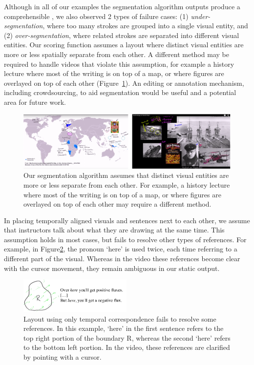 Although in all of our examples the segmentation algorithm outputs produce a comprehensible \systemname , we also observed 2 types of failure cases: (1) \textit{under-segmentation}, where too many strokes are grouped into a single visual entity, and (2) \textit{over-segmentation}, where related strokes are separated into different visual entities. Our scoring function assumes a layout where distinct visual entities are more or less spatially separate from each other. A different method may be required to handle videos that violate this assumption, for example a history lecture where most of the writing is on top of a map, or where figures are overlayed on top of each other (Figure~\ref{fig:humanities_lec}).  An editing or annotation mechanism, including crowdsourcing, to aid segmentation would be useful and a potential area for future work.\\
%
\begin{figure}[h!]
        \centering
        \includegraphics[width=\textwidth]{figures/humanities_lec.pdf}
                \captionsetup{font=footnotesize}
	\caption{Our segmentation algorithm assumes that distinct visual entities are more or less separate from each other. For example, a history lecture
where most of the writing is on top of a map, or where figures are overlayed
on top of each other may require a different method. }
        \label{fig:humanities_lec}
\end{figure}
%

In placing temporally aligned visuals and sentences next to each other, we assume that instructors talk about what they are drawing at the same time. This assumption holds in most cases, but fails to resolve other types of references. For example, in Figure\ref{fig:gesture}, the pronoun `here' is used twice, each time referring to a different part of the visual. Whereas in the video these references become clear with the cursor movement, they remain ambiguous in our static output.

\begin{figure}[h!]
        \centering
        \includegraphics[width=2.2in]{figures/gesture.pdf}
                \captionsetup{font=footnotesize}
	\caption{Layout using only temporal correspondence fails to resolve some references. In this example, `here' in the first sentence refers to the top right portion of the boundary R, whereas the second `here' refers to the bottom left portion. In the video, these references are clarified by pointing with a cursor.}
        \label{fig:gesture}
\end{figure}

